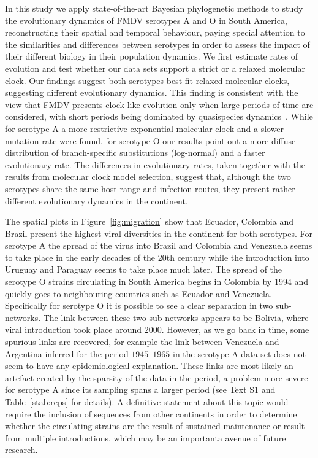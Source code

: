 \documentclass[10pt]{article}
\begin{document}
In this study we apply state-of-the-art Bayesian phylogenetic methods to study the evolutionary dynamics of FMDV serotypes A and O in South America, reconstructing their spatial and temporal behaviour, paying special attention to the similarities and differences between serotypes in order to assess the impact of their different biology in their population dynamics.
We first estimate rates of evolution and test whether our data sets support a strict or a relaxed molecular clock.
Our findings suggest both serotypes best fit relaxed molecular clocks, suggesting different evolutionary dynamics.
This finding is consistent with the view that FMDV presents clock-like evolution only when large periods of time are considered, with short periods being dominated by quasispecies dynamics~\cite{Muellner2011}.  
While for serotype A a more restrictive exponential molecular clock and a slower mutation rate were found, for serotype O our results point out a more diffuse distribution of branch-specific substitutions (log-normal) and a faster evolutionary rate.
The differences in evolutionary rates, taken together with the results from molecular clock model selection, suggest that, although the two serotypes share the same host range and infection routes, they present rather different evolutionary dynamics in the continent. 

The spatial plots in Figure~\ref{fig:migration} show that Ecuador, Colombia and Brazil present the highest viral diversities in the continent for both serotypes.
For serotype A the spread of the virus into  Brazil and Colombia and Venezuela seems to take place in the early decades of the 20th century while the introduction into Uruguay and Paraguay seems to take place much later.
The spread of the serotype O strains  circulating  in South America begins in Colombia by $1994$ and quickly goes to neighbouring countries such as Ecuador and Venezuela.
Specifically for serotype O it is possible to see a clear separation in two sub-networks.
The link between these two sub-networks appears to be Bolivia, where viral introduction took place around $2000$. 
However, as we go back in time, some spurious links are recovered, for example the link between Venezuela and Argentina inferred for the period $1945$--$1965$ in the serotype A data set does not seem to have any epidemiological explanation.
These links are most likely an artefact created by the sparsity of the data in the period, a problem more severe for serotype A since its sampling spans a larger period (see Text S1 and Table~\ref{stab:reps} for details).
A definitive statement about this topic would require the inclusion of sequences from other continents in order to determine whether the circulating strains are the result of sustained maintenance or result from multiple introductions, which may be an importanta avenue of future research.
\end{document}
